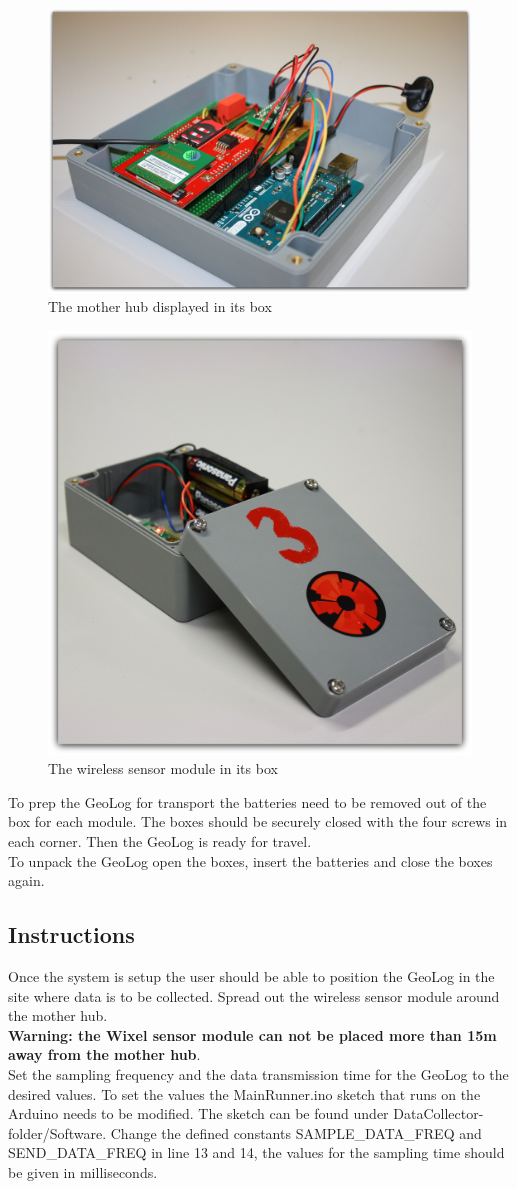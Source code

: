 \begin{figure}[H]
\centering
\includegraphics[width=0.6\linewidth]{graphics/Main_Open.jpg}
\caption{The mother hub displayed in its box\label{fig:Main_Open}}
\end{figure}
\begin{figure}[H]
\centering
\includegraphics[width=0.6\linewidth]{graphics/Wixel_sensor.jpg}
\caption{The wireless sensor module in its box\label{fig:Wixel_sensor}}
\end{figure}

To prep the GeoLog for transport the batteries need to be removed out of the box for each module. The boxes should be securely closed with the four screws in each corner. Then the GeoLog is ready for travel.\\
To unpack the GeoLog open the boxes, insert the batteries and close the boxes again.

\subsection{Instructions}
Once the system is setup the user should be able to position the GeoLog in the site where data is to be collected. Spread out the wireless sensor module around the mother hub.\\
\textbf{Warning: the Wixel sensor module can not be placed more than 15m away from the mother hub}.\\
Set the sampling frequency and the data transmission time for the GeoLog to the desired values. To set the values the MainRunner.ino sketch that runs on the Arduino needs to be modified. The sketch can be found under DataCollector-folder/Software. Change the defined constants SAMPLE\_DATA\_FREQ and SEND\_DATA\_FREQ in line 13 and 14, the values for the sampling time should be given in milliseconds.\\






